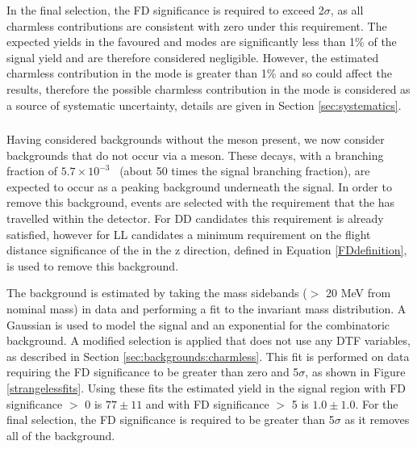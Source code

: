 In the final selection, the \Dz FD significance is required to exceed 2$\sigma$, as all charmless contributions are consistent with zero under this requirement. The expected yields in the \kpi favoured and \kk modes are significantly less than 1\% of the signal yield and are therefore considered negligible. However, the estimated charmless contribution in the \pipi mode is greater than 1\% and so could affect the results, therefore the possible charmless contribution in the \pipi mode is considered as a source of systematic uncertainty, details are given in Section \ref{sec:systematics}. 

\subsubsection{\boldmath \decay{\Bm}{\D\pim\pip\pim}}
\label{sec:backgrounds:b2dpipipi}

Having considered backgrounds without the \Dz meson present, we now consider backgrounds that do not occur via a \KS meson. These \decay{\Bm}{\D\pim\pip\pim} decays, with a branching fraction of $5.7 \times 10^{-3}$~\cite{PDG2014} (about 50 times the signal \decay{\Bm}{\D\Kstarm(\KS(\pip\pim)\pim)} branching fraction), are expected to occur as a peaking background underneath the signal. In order to remove this background, events are selected with the requirement that the \KS has travelled within the detector. For DD candidates this requirement is already satisfied, however for LL candidates a minimum requirement on the flight distance significance of the \KS in the z direction, defined in Equation \ref{FDdefinition}, is used to remove this background. 

The \decay{\Bm}{\D\pim\pip\pim} background is estimated by taking the \KS mass sidebands ($>$ 20 MeV from nominal \KS mass) in data and performing a fit to the invariant \Bm mass distribution. A Gaussian is used to model the signal and an exponential for the combinatoric background. A modified selection is applied that does not use any DTF variables, as described in Section \ref{sec:backgrounds:charmless}. This fit is performed on \kpi data requiring the \KS FD significance to be greater than zero and 5$\sigma$, as shown in Figure \ref{strangelessfits}. Using these fits the estimated \decay{\B}{\D\pi\pi\pi} yield in the signal region with \KS FD significance $>$ 0 is $77 \pm 11$ and with \KS FD significance $>$ 5 is $1.0 \pm 1.0$. For the final selection, the FD significance is required to be greater than 5$\sigma$ as it removes all of the \decay{\Bm}{\D\pim\pip\pim} background.


